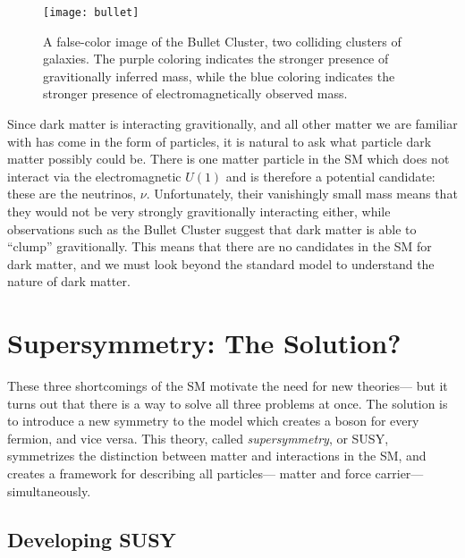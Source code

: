 
\begin{figure}
\centering
\texttt{[image: bullet]}
\label{fig:susy:bullet}
\caption{A false-color image of the Bullet Cluster, two colliding clusters of galaxies. The purple coloring indicates the stronger presence of gravitionally inferred mass, while the blue coloring indicates the stronger presence of electromagnetically observed mass.}
\end{figure}


Since dark matter is interacting gravitionally, and all other matter we are familiar with has come in the form of particles, it is natural to ask what particle dark matter possibly could be. There is one matter particle in the SM which does not interact via the electromagnetic $U(1)$ and is therefore a potential candidate: these are the neutrinos, $\nu$. Unfortunately, their vanishingly small mass means that they would not be very strongly gravitionally interacting either, while observations such as the Bullet Cluster suggest that dark matter is able to ``clump'' gravitionally. This means that there are no candidates in the SM for dark matter, and we must look beyond the standard model to understand the nature of dark matter.


\section{Supersymmetry: The Solution?}


These three shortcomings of the SM motivate the need for new theories--- but it turns out that there is a way to solve all three problems at once. The solution is to introduce a new symmetry to the model which creates a boson for every fermion, and vice versa. This theory, called \textit{supersymmetry}, or SUSY, symmetrizes the distinction between matter and interactions in the SM, and creates a framework for describing all particles--- matter and force carrier--- simultaneously.


\subsection{Developing SUSY} 

\label{chapter:susy:susy:developing}

